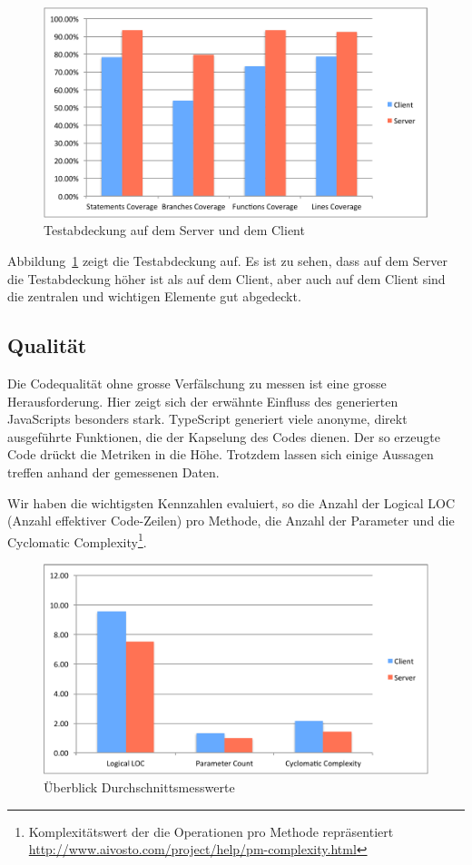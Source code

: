 	\begin{figure}[H]
		\includegraphics[width=\textwidth]{projectPlan/media/img/coverage.pdf}
		\centering
		\caption{Testabdeckung auf dem Server und dem Client}
		\label{fig:coverage}
	\end{figure}
	
	Abbildung\ \ref{fig:coverage} zeigt die Testabdeckung auf.
	Es ist zu sehen, dass auf dem Server die Testabdeckung höher ist als auf dem Client,
	aber auch auf dem Client sind die zentralen und wichtigen Elemente gut abgedeckt.
	
	
	\subsection{Qualität}
	Die Codequalität ohne grosse Verfälschung zu messen ist eine grosse Herausforderung.
	Hier zeigt sich der erwähnte Einfluss des generierten JavaScripts besonders stark. TypeScript generiert viele anonyme, direkt ausgeführte Funktionen, die der Kapselung des Codes dienen. 
	Der so erzeugte Code drückt die Metriken in die Höhe. Trotzdem lassen sich einige Aussagen treffen anhand der gemessenen Daten.
	
	Wir haben die wichtigsten Kennzahlen evaluiert,
	so die Anzahl der Logical LOC (Anzahl effektiver Code-Zeilen) pro Methode, die Anzahl der Parameter und die Cyclomatic Complexity\footnote{Komplexitätswert der die Operationen pro Methode repräsentiert \url{http://www.aivosto.com/project/help/pm-complexity.html}}.
	
	\begin{figure}[H]
		\includegraphics[width=\textwidth]{projectPlan/media/img/methodComplexityOverview.pdf}
		\centering
		\caption{Überblick Durchschnittsmesswerte}
		\label{fig:methodComplexityOverview}
	\end{figure}
	
